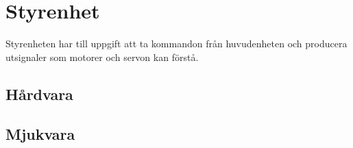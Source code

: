 
\section{Styrenhet}

Styrenheten har till uppgift att ta kommandon från huvudenheten och producera utsignaler som motorer och servon kan förstå.

\subsection{Hårdvara}



\subsection{Mjukvara}

